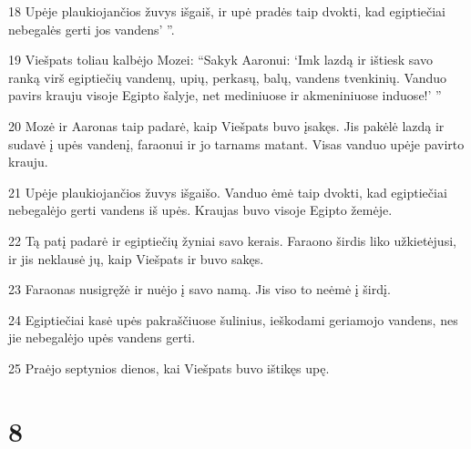 \par 18 Upėje plaukiojančios žuvys išgaiš, ir upė pradės taip dvokti, kad egiptiečiai nebegalės gerti jos vandens’ ”. 
\par 19 Viešpats toliau kalbėjo Mozei: “Sakyk Aaronui: ‘Imk lazdą ir ištiesk savo ranką virš egiptiečių vandenų, upių, perkasų, balų, vandens tvenkinių. Vanduo pavirs krauju visoje Egipto šalyje, net mediniuose ir akmeniniuose induose!’ ” 
\par 20 Mozė ir Aaronas taip padarė, kaip Viešpats buvo įsakęs. Jis pakėlė lazdą ir sudavė į upės vandenį, faraonui ir jo tarnams matant. Visas vanduo upėje pavirto krauju. 
\par 21 Upėje plaukiojančios žuvys išgaišo. Vanduo ėmė taip dvokti, kad egiptiečiai nebegalėjo gerti vandens iš upės. Kraujas buvo visoje Egipto žemėje. 
\par 22 Tą patį padarė ir egiptiečių žyniai savo kerais. Faraono širdis liko užkietėjusi, ir jis neklausė jų, kaip Viešpats ir buvo sakęs. 
\par 23 Faraonas nusigręžė ir nuėjo į savo namą. Jis viso to neėmė į širdį. 
\par 24 Egiptiečiai kasė upės pakraščiuose šulinius, ieškodami geriamojo vandens, nes jie nebegalėjo upės vandens gerti. 
\par 25 Praėjo septynios dienos, kai Viešpats buvo ištikęs upę.



\chapter{8}

